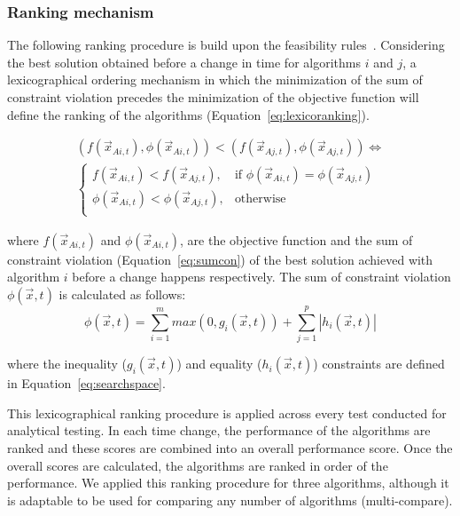 \documentclass[conference]{IEEEtran}
\begin{document}
\subsubsection{Ranking mechanism}
\label{subsec:RankigMech}
The following ranking procedure is build upon the feasibility rules~\cite{deb2000efficient}. Considering the best solution obtained before a change in time for algorithms $i$ and $j$, a lexicographical ordering mechanism in which the minimization of the sum of constraint violation precedes the minimization of the objective function will define the ranking of the algorithms (Equation~\ref{eq:lexicoranking}). 

\begin{equation}
\begin{split}
\label{eq:lexicoranking}
    (f(\vec{x}_{Ai,t}), \phi(\vec{x}_{Ai,t}))  <  (f(\vec{x}_{Aj,t}), \phi(\vec{x}_{Aj,t}))
    \Leftrightarrow\\
    \begin{cases}
            f(\vec{x}_{Ai,t}) < f(\vec{x}_{Aj,t}), & \text{if } \phi(\vec{x}_{Ai,t}) = \phi(\vec{x}_{Aj,t})  \\
            \phi(\vec{x}_{Ai,t}) < \phi(\vec{x}_{Aj,t}), & \text{otherwise} \\
    \end{cases}
    \end{split}
\end{equation}

where $f(\vec{x}_{Ai,t})$ and $\phi(\vec{x}_{Ai,t})$, are the objective function and the sum of constraint violation (Equation~\ref{eq:sumcon}) of the best solution achieved with algorithm $i$ before a change happens respectively.
The sum of constraint violation $\phi(\vec{x},t)$ is  calculated as follows:
\begin{equation}
	\label{eq:sumcon}
	 \phi(\vec{x},t) =  \sum\limits_{i=1}^m max(0,g_i(\vec{x},t)) +  \sum\limits_{j=1}^p |h_i(\vec{x},t)|
\end{equation} 

where the inequality ($g_i(\vec{x},t)$) and equality ($h_i(\vec{x},t)$) constraints are defined in Equation~\ref{eq:searchspace}.

This lexicographical ranking procedure is applied across every test conducted for analytical testing. In each time change, the performance of the algorithms are ranked and these scores are combined into an overall performance score. Once the overall scores are calculated, the algorithms are ranked in order of the performance. We applied this ranking procedure for three algorithms, although it is adaptable to be used for comparing any number of algorithms (multi-compare).
\end{document}
